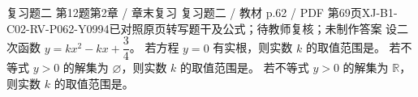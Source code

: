 \par\noindent\begin{minipage}{\linewidth}
\begin{bankitem}{复习题二 第12题}{第2章 / 章末复习 复习题二 / 教材 p.62 / PDF 第69页}{XJ-B1-C02-RV-P062-Y0994}{已对照原页转写题干及公式；待教师复核；未制作答案}
设二次函数 $y=kx^2-kx+\dfrac34$。
若方程 $y=0$ 有实根，则实数 $k$ 的取值范围是\blank。
若不等式 $y>0$ 的解集为 $\varnothing$，则实数 $k$ 的取值范围是\blank。
若不等式 $y>0$ 的解集为 $\mathbb R$，则实数 $k$ 的取值范围是\blank。
\end{bankitem}
\end{minipage}\par\medskip

